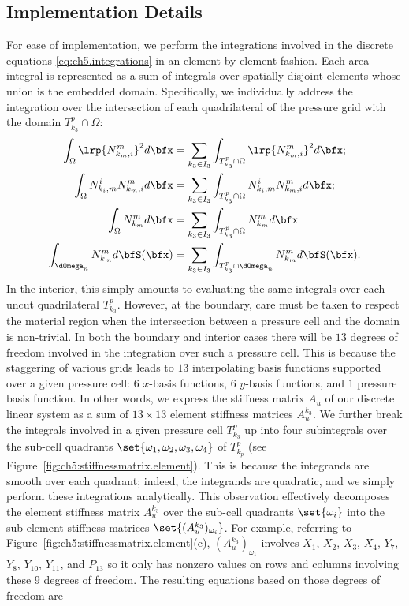 \subsection{Implementation Details} \label{subsec:ch5.implementation}

For ease of implementation, we perform the integrations involved in the discrete equations \eqref{eq:ch5.integrations} in an element-by-element fashion. Each area integral is represented as a sum of integrals over spatially disjoint elements whose union is the embedded domain. Specifically, we individually address the integration over the intersection of each quadrilateral of the pressure grid with the domain $T^p_{k_3} \cap \Omega$:
\begin{align*}
\int_{\Omega} \lrp{N^m_{k_m,i}}^2 d\bfx & = \sum_{k_3 \in I_3} \int_{T^p_{k_3} \cap \Omega} \lrp{N^m_{k_m,i}}^2 d\bfx; \\
\int_{\Omega} N^i_{k_i,m} N^m_{k_m,i} d\bfx & = \sum_{k_3 \in I_3} \int_{T^p_{k_3} \cap \Omega} N^i_{k_i,m} N^m_{k_m,i} d\bfx; \\
\int_{\Omega} N^m_{k_m} d\bfx & = \sum_{k_3 \in I_3} \int_{T^p_{k_3} \cap \Omega} N^m_{k_m} d\bfx \\
\int_{\dOmega_n} N^m_{k_m} d\bfS(\bfx) & = \sum_{k_3 \in I_3} \int_{T^p_{k_3} \cap \dOmega_n} N^m_{k_m} d\bfS(\bfx).
\end{align*}
In the interior, this simply amounts to evaluating the same integrals over each uncut quadrilateral $T^p_{k_3}$. However, at the boundary, care must be taken to respect the material region when the intersection between a pressure cell and the domain is non-trivial. In both the boundary and interior cases there will be $13$ degrees of freedom involved in the integration over such a pressure cell. This is because the staggering of various grids leads to $13$ interpolating basis functions supported over a given pressure cell: $6$ $x$-basis functions, $6$ $y$-basis functions, and $1$ pressure basis function. In other words, we express the stiffness matrix $A_u$ of our discrete linear system as a sum of $13 \times 13$ element stiffness matrices $A_u^{k_3}$. We further break the integrals involved in a given pressure cell $T^p_{k_3}$ up into four subintegrals over the sub-cell quadrants $\set{\omega_1, \omega_2, \omega_3, \omega_4}$ of $T^p_{k_p}$ (see Figure~\ref{fig:ch5:stiffnessmatrix.element}). This is because the integrands are smooth over each quadrant; indeed, the integrands are quadratic, and we simply perform these integrations analytically. This observation effectively decomposes the element stiffness matrix $A_u^{k_3}$ over the sub-cell quadrants $\set{\omega_i}$ into the sub-element stiffness matrices $\set{(A_u^{k_3})_{\omega_i}}$. For example, referring to Figure~\ref{fig:ch5:stiffnessmatrix.element}(c), $(A_u^{k_3})_{\omega_1}$ involves $X_1$, $X_2$, $X_3$, $X_4$, $Y_7$, $Y_8$, $Y_{10}$, $Y_{11}$, and $P_{13}$ so it only has nonzero values on rows and columns involving these $9$ degrees of freedom. The resulting equations based on those degrees of freedom are
